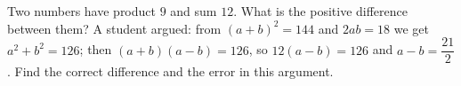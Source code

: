 Two numbers have product $9$ and sum $12$. What is the positive difference between them? A student argued: from $(a+b)^2=144$ and $2ab=18$ we get $a^2+b^2=126$; then $(a+b)(a-b)=126$, so $12(a-b)=126$ and $a-b=\dfrac{21}{2}$. Find the correct difference and the error in this argument.
